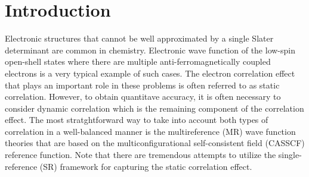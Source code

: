 \documentclass[aip,jcp,amsmath]{revtex4-1}
\begin{document}
\section{Introduction}
%
Electronic structures that cannot be well approximated by a single Slater determinant are common in chemistry.
%
Electronic wave function of the low-spin open-shell states where there are multiple anti-ferromagnetically coupled electrons is a very typical example of such cases.\cite{NEESE2009526}
%
The electron correlation effect that plays an important role in these problems is often referred to as static correlation.\cite{doi:10.1021/cr2001417}
%
However, to obtain quantitave accuracy, it is often necessary to consider dynamic correlation which is the remaining component of the correlation effect.
%
The most stratghtforward way to take into account both types of correlation in a well-balanced manner is the multireference (MR) wave function theories\cite{MCSCFandMRCI2011,doi:10.1021/cr300500z} that are based on the multiconfigurational self-consistent field (CASSCF) reference function.\cite{roosa1980,Roos1987,ruedenbergmcscf1979}
%
Note that there are tremendous attempts to utilize the single-reference (SR) framework\cite{doi:10.1063/1.481769,doi:10.1063/1.1290609,doi:10.1021/jp056791e,doi:10.1021/acs.jctc.9b00456,doi:10.1063/1.4991020,doi:10.1063/1.5053605,doi:10.1063/1.5085314,doi:10.1021/acs.jctc.6b00137,doi:10.1063/1.5036542,doi:10.1002/jcc.25163} for capturing the static correlation effect.
\end{document}
